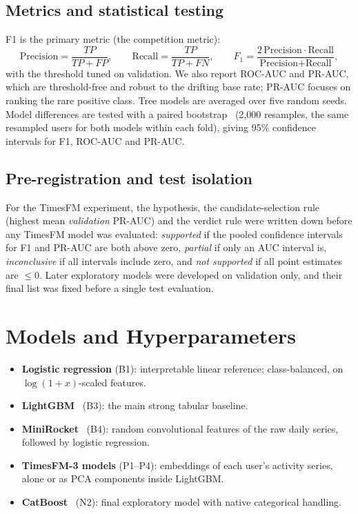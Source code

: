 \documentclass[11pt,a4paper]{article}
\begin{document}
\subsection{Metrics and statistical testing}
F1 is the primary metric (the competition metric):
\[
\text{Precision}=\frac{TP}{TP+FP},\qquad \text{Recall}=\frac{TP}{TP+FN},\qquad
F_1=\frac{2\,\text{Precision}\cdot\text{Recall}}{\text{Precision}+\text{Recall}},
\]
with the threshold tuned on validation. We also report ROC-AUC and PR-AUC, which are threshold-free and
robust to the drifting base rate; PR-AUC focuses on ranking the rare positive class. Tree models are averaged
over five random seeds. Model differences are tested with a paired bootstrap~\citep{efron1993bootstrap}
(2{,}000 resamples, the same resampled users for both models within each fold), giving 95\% confidence
intervals for F1, ROC-AUC and PR-AUC.

\subsection{Pre-registration and test isolation}
For the TimesFM experiment, the hypothesis, the candidate-selection rule (highest mean \emph{validation}
PR-AUC) and the verdict rule were written down before any TimesFM model was evaluated: \emph{supported} if the
pooled confidence intervals for F1 and PR-AUC are both above zero, \emph{partial} if only an AUC interval is,
\emph{inconclusive} if all intervals include zero, and \emph{not supported} if all point estimates are
$\le 0$. Later exploratory models were developed on validation only, and their final list was fixed before a
single test evaluation.

\section{Models and Hyperparameters}
\begin{itemize}
  \item \textbf{Logistic regression} (B1): interpretable linear reference; class-balanced, on $\log(1+x)$-scaled features.
  \item \textbf{LightGBM}~\citep{ke2017lightgbm} (B3): the main strong tabular baseline.
  \item \textbf{MiniRocket}~\citep{dempster2021minirocket} (B4): random convolutional features of the raw daily series, followed by logistic regression.
  \item \textbf{TimesFM-3 models} (P1--P4): embeddings of each user's activity series, alone or as PCA components inside LightGBM.
  \item \textbf{CatBoost}~\citep{prokhorenkova2018catboost} (N2): final exploratory model with native categorical handling.
\end{itemize}
\end{document}
